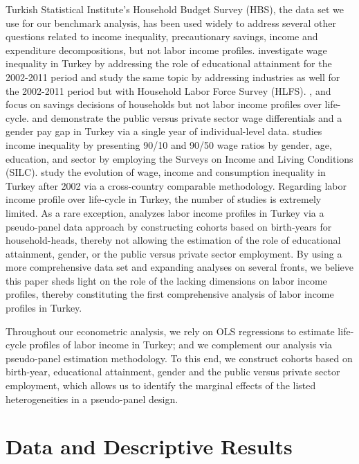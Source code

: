 \documentclass[12pt,author-year]{article}
\begin{document}
Turkish Statistical Institute's Household Budget Survey (HBS), the data set we use for our benchmark analysis, has been used widely to address several other questions related to income inequality, precautionary savings, income and expenditure decompositions, but not labor income profiles. \cite{Eksi} investigate wage inequality in Turkey by addressing the role of educational attainment for the 2002-2011 period and \cite{Bakis} study the same topic by addressing industries as well for the 2002-2011 period but with Household Labor Force Survey (HLFS). \cite{Nazli}, \cite{Yukseler} and \cite{Ceritoglu} focus on savings decisions of households but not labor income profiles over life-cycle. \cite{Tansel05} and \cite{Tansel94} demonstrate the public versus private sector wage differentials and a gender pay gap in Turkey via a single year of individual-level data. \cite{Tansel18} studies income inequality by presenting 90/10 and 90/50 wage ratios by gender, age, education, and sector by employing the Surveys on Income and Living Conditions (SILC). \cite{Tamkoc08} study the evolution of wage, income and consumption inequality in Turkey after 2002 via a cross-country comparable methodology. Regarding labor income profile over life-cycle in Turkey, the number of studies is extremely limited. As a rare exception, \cite{Cilasun} analyzes labor income profiles in Turkey via a pseudo-panel data approach by constructing cohorts based on birth-years for household-heads, thereby not allowing the estimation of the role of educational attainment, gender, or the public versus private sector employment. By using a more comprehensive data set and expanding analyses on several fronts, we believe this paper sheds light on the role of the lacking dimensions on labor income profiles, thereby constituting the first comprehensive analysis of labor income profiles in Turkey. 

Throughout our econometric analysis, we rely on OLS regressions to estimate life-cycle profiles of labor income in Turkey; and we complement our analysis via pseudo-panel estimation methodology. To this end, we construct cohorts based on birth-year, educational attainment, gender and the public versus private sector employment, which allows us to identify the marginal effects of the listed heterogeneities in a pseudo-panel design.

\section{Data and Descriptive Results}
\label{Section3}
\end{document}
